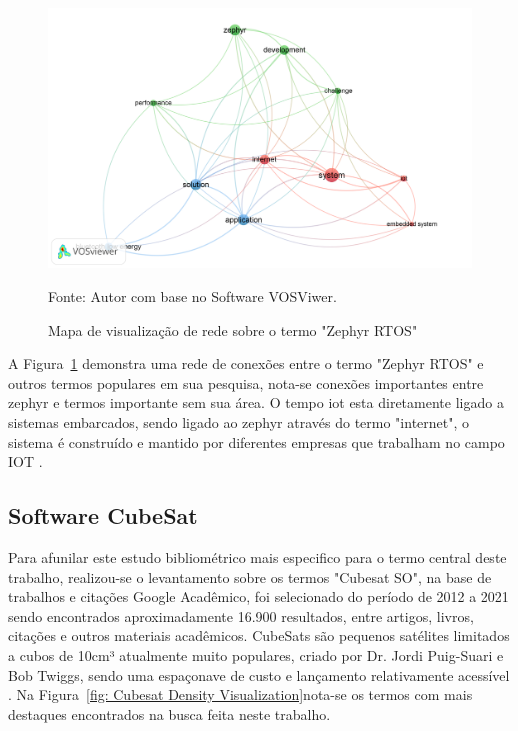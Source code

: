 \begin{figure}[H]
	\centering
	\includegraphics[width=15cm]{imagens/Zephyr_RTOS_Network_visualization.png}
	\caption{Mapa de visualização de rede sobre o termo "Zephyr RTOS"}
	Fonte: Autor com base no Software VOSViwer.
	\label{fig: Zephyr Network Visualization}
\end{figure}

A Figura~\ref{fig: Zephyr Network Visualization} demonstra uma rede de conexões entre o termo "Zephyr RTOS" 
e outros termos populares em sua pesquisa, nota-se conexões importantes entre zephyr e termos importante sem 
sua área. O tempo iot esta diretamente ligado a sistemas embarcados, sendo ligado ao zephyr através do termo 
"internet", o sistema é construído e mantido por diferentes empresas que trabalham no campo IOT 
\cite{huber_porting_2019}.


\subsection{Software CubeSat}
Para afunilar este estudo bibliométrico mais especifico para o termo central deste trabalho, realizou-se o 
levantamento sobre os termos "Cubesat SO", na base de trabalhos e citações Google Acadêmico, foi selecionado 
do período de 2012 a 2021 sendo encontrados aproximadamente 16.900 resultados, entre artigos, livros, 
citações e outros materiais acadêmicos. CubeSats são pequenos satélites limitados a cubos de 10cm³ atualmente 
muito populares, criado por Dr. Jordi Puig-Suari e Bob Twiggs, sendo uma espaçonave de custo e lançamento 
relativamente acessível \cite{Manyak2011FaultTA}. Na Figura~\ref{fig: Cubesat Density Visualization}nota-se 
os termos com mais destaques encontrados na busca feita neste trabalho.


